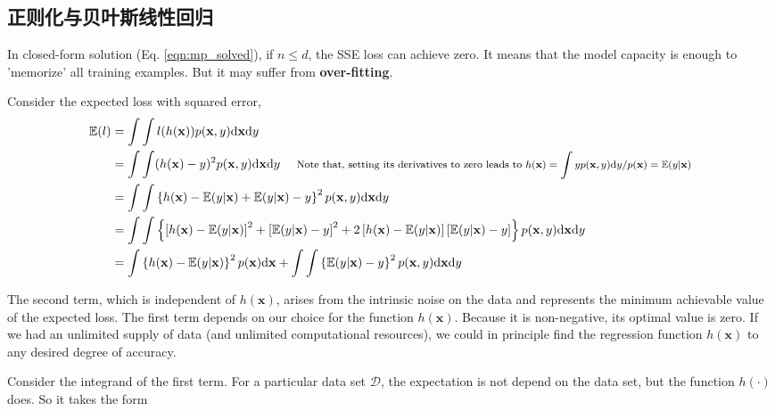\documentclass{article}
\begin{document}
	\subsection{正则化与贝叶斯线性回归}
	
	In closed-form solution (Eq. \ref{eqn:mp_solved}), if $n\leq d$, the SSE loss can achieve zero. It means that the model capacity is enough to 'memorize' all training examples. But it may suffer from \textbf{over-fitting}.
	
	Consider the expected loss with squared error,
	\begin{equation}
	\begin{split}
	\mathbb{E}(l) &= \int \int l(h(\mathbf{x})) p(\mathbf{x}, y) \text{d} \mathbf{x} \text{d}y \\
	&= \int \int (h(\mathbf{x})-y)^2 p(\mathbf{x}, y) \text{d} \mathbf{x} \text{d}y
	\ \ \ \ \footnotesize{\text{Note that, setting its derivatives to zero leads to $h(\mathbf{x}) = \int yp(\mathbf{x}, y) \text{d} y /p(\mathbf{x}) = \mathbb{E}(y|\mathbf{x})$}}\\
	&= \int \int \left\{ h(\mathbf{x}) - \mathbb{E} (y|\mathbf{x}) + \mathbb{E} (y|\mathbf{x}) - y \right\}^2 p(\mathbf{x}, y) \text{d} \mathbf{x} \text{d}y \\
	&= \int \int \left\{ \left[ h(\mathbf{x}) - \mathbb{E} (y|\mathbf{x}) \right]^2 + \left[\mathbb{E} (y|\mathbf{x}) - y \right]^2 + 2 \left[ h(\mathbf{x}) - \mathbb{E} (y|\mathbf{x}) \right] \left[\mathbb{E} (y|\mathbf{x}) - y \right]  \right\} p(\mathbf{x}, y) \text{d} \mathbf{x} \text{d}y \\
	&= \int \left\{ h(\mathbf{x}) - \mathbb{E} (y|\mathbf{x}) \right\}^2 p(\mathbf{x}) \text{d} \mathbf{x} + \int \int \left\{\mathbb{E} (y|\mathbf{x}) - y \right\}^2 p(\mathbf{x}, y) \text{d} \mathbf{x} \text{d} y
	\end{split}
	\end{equation}
	
	The second term, which is independent of $h(\mathbf{x})$, arises from the intrinsic noise on the data and represents the minimum achievable value of the expected loss. The first term depends on our choice for the function $h(\mathbf{x})$. Because it is non-negative, its optimal value is zero. If we had an unlimited supply of data (and unlimited computational resources), we could in principle find the regression function $h(\mathbf{x})$ to any desired degree of accuracy.
	
	Consider the integrand of the first term. For a particular data set $\mathcal{D}$, the expectation is not depend on the data set, but the function $h(\cdot)$ does. So it takes the form
	
\end{document}
